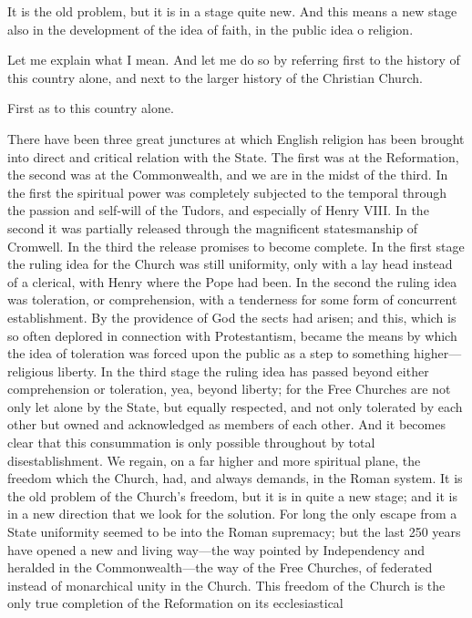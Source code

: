 \documentclass[12pt,a5paper,twoside]{book}
\begin{document}
It is the old problem, but it is in a stage quite 
new. And this means a new stage also in the 
development of the idea of faith, in the public idea o 
religion. 

Let me explain what I mean. And let me do so 
by referring first to the history of this country alone, 
and next to the larger history of the Christian 
Church. 

First as to this country alone. 

There have been three great junctures at which 
English religion has been brought into direct and 
critical relation with the State. The first was at the 
Reformation, the second was at the Commonwealth, 
and we are in the midst of the third. In the first 
the spiritual power was completely subjected to the 
temporal through the passion and self-will of the 
Tudors, and especially of Henry VIII. In the second 
it was partially released through the magnificent statesmanship 
of Cromwell. In the third the release 
promises to become complete. In the first stage the 
ruling idea for the Church was still uniformity, only 
with a lay head instead of a clerical, with Henry 
where the Pope had been. In the second the ruling 
idea was toleration, or comprehension, with a tenderness 
for some form of concurrent establishment. By 
the providence of God the sects had arisen; and this, 
which is so often deplored in connection with Protestantism, 
became the means by which the idea of 
toleration was forced upon the public as a step to 
something higher---religious liberty. In the third 
stage the ruling idea has passed beyond either comprehension 
or toleration, yea, beyond liberty; for the Free 
Churches are not only let alone by the State, but 
equally respected, and not only tolerated by each other 
but owned and acknowledged as members of each 
other. And it becomes clear that this consummation 
is only possible throughout by total disestablishment. 
We regain, on a far higher and more spiritual plane, 
the freedom which the Church, had, and always 
demands, in the Roman system. It is the old problem 
of the Church's freedom, but it is in quite a new 
stage; and it is in a new direction that we look for 
the solution. For long the only escape from a State 
uniformity seemed to be into the Roman supremacy; 
but the last 250 years have opened a new and 
living way---the way pointed by Independency and 
heralded in the Commonwealth---the way of the Free 
Churches, of federated instead of monarchical unity in 
the Church. This freedom of the Church is the 
only true completion of the Reformation on its ecclesiastical 
\end{document}
